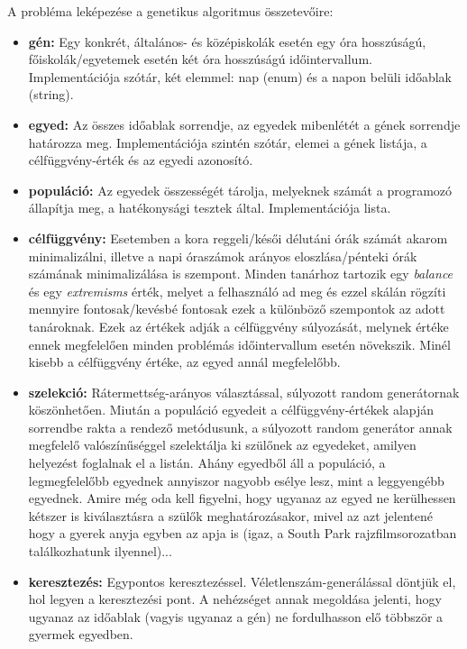 \documentclass[a4paper,12pt]{article}
\begin{document}
\noindent A probléma leképezése a genetikus algoritmus összetevőire:

\begin{itemize}
    \item \textbf{gén:} Egy konkrét, általános- és középiskolák esetén egy óra hosszúságú, 	          főiskolák/egyetemek esetén két óra hosszúságú időintervallum. Implementációja szótár, két elemmel: nap (enum) és a napon belüli időablak (string).
    \item \textbf{egyed:} Az összes időablak sorrendje, az egyedek mibenlétét a gének sorrendje határozza meg. Implementációja szintén szótár, elemei a gének listája, a célfüggvény-érték és az
egyedi azonosító.
    \item \textbf{populáció:} Az egyedek összességét tárolja, melyeknek számát a programozó állapítja meg, a hatékonysági tesztek által. Implementációja lista.
    \item \textbf{célfüggvény:} Esetemben a kora reggeli/késői délutáni órák számát akarom minimalizálni, illetve a napi óraszámok arányos eloszlása/pénteki órák számának minimalizálása is szempont. Minden tanárhoz tartozik egy \textsl{balance} és egy \textsl{extremisms} érték,
melyet a felhasználó ad meg és ezzel skálán rögzíti mennyire fontosak/kevésbé fontosak ezek a különböző szempontok az adott tanároknak. Ezek az értékek adják a célfüggvény súlyozását, melynek értéke ennek megfelelően minden problémás időintervallum esetén növekszik. Minél kisebb a célfüggvény értéke, az egyed annál megfelelőbb.
    \item \textbf{szelekció:} Rátermettség-arányos választással, súlyozott random generátornak köszönhetően. Miután a populáció egyedeit a célfüggvény-értékek alapján sorrendbe rakta a rendező metódusunk, a súlyozott random generátor annak megfelelő valószínűséggel szelektálja ki szülőnek az egyedeket, amilyen helyezést foglalnak el a listán. Ahány egyedből áll a populáció, a legmegfelelőbb egyednek annyiszor nagyobb esélye lesz, mint a leggyengébb egyednek. Amire még oda kell figyelni, hogy ugyanaz az egyed ne kerülhessen kétszer is kiválasztásra a szülők meghatározásakor, mivel az azt jelentené hogy a gyerek anyja egyben az apja is (igaz, a South Park rajzfilmsorozatban találkozhatunk ilyennel)...
    \item \textbf{keresztezés:} Egypontos keresztezéssel. Véletlenszám-generálással döntjük el, hol legyen a keresztezési pont. A nehézséget annak megoldása jelenti, hogy ugyanaz az időablak (vagyis ugyanaz a gén) ne fordulhasson elő többször a gyermek egyedben.
\end{itemize}
\end{document}
